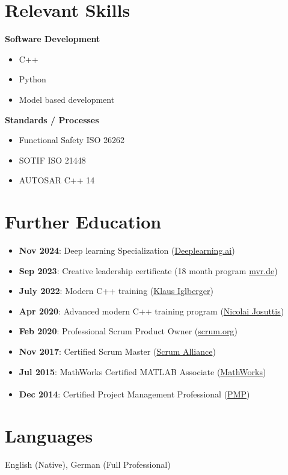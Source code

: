 \documentclass[10pt,a4paper]{article}
\begin{document}
\vspace{1.2em}

\section*{Relevant Skills}

\begin{minipage}[t]{0.48\textwidth}
    \textbf{\textcolor{primary}{Software Development}}
    \begin{itemize}
        \item C++
        \item Python
        \item Model based development
    \end{itemize}
\end{minipage}
\hfill
\begin{minipage}[t]{0.48\textwidth}
    \textbf{\textcolor{primary}{Standards / Processes}}
    \begin{itemize}
        \item Functional Safety ISO 26262
        \item SOTIF ISO 21448
        \item AUTOSAR C++ 14
    \end{itemize}
\end{minipage}

\vspace{1.2em}

\section*{Further Education}

\begin{itemize}
    \item \textbf{Nov 2024}: Deep learning Specialization (\href{https://www.deeplearning.ai}{Deeplearning.ai})
    \item \textbf{Sep 2023}: Creative leadership certificate (18 month program \href{https://mvr.de}{mvr.de})
    \item \textbf{July 2022}: Modern C++ training (\href{https://klaus-iglberger.com}{Klaus Iglberger})
    \item \textbf{Apr 2020}: Advanced modern C++ training program (\href{https://nicolaijosuttis.com}{Nicolai Josuttis})
    \item \textbf{Feb 2020}: Professional Scrum Product Owner (\href{https://scrum.org}{scrum.org})
    \item \textbf{Nov 2017}: Certified Scrum Master (\href{https://scrumalliance.org}{Scrum Alliance})
    \item \textbf{Jul 2015}: MathWorks Certified MATLAB Associate (\href{https://www.mathworks.com}{MathWorks})
    \item \textbf{Dec 2014}: Certified Project Management Professional (\href{https://www.pmi.org}{PMP}\textsuperscript{\textregistered})
\end{itemize}

\vspace{1.2em}


\section*{Languages}
English (Native), German (Full Professional)
\end{document}
